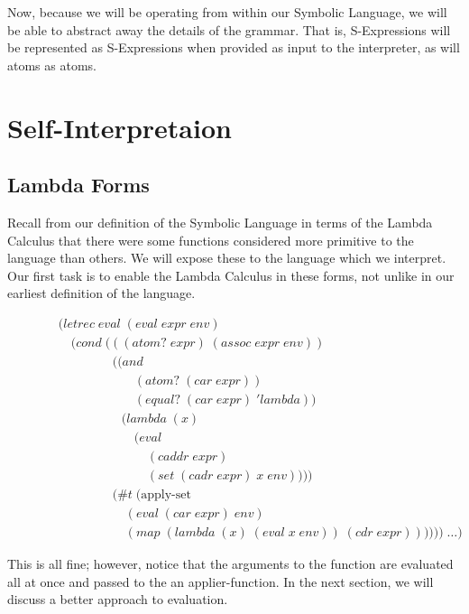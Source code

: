 Now, because we will be operating from within our Symbolic Language, we will 
be able to abstract away the details of the grammar. That is, S-Expressions 
will be represented as S-Expressions when provided as input to the 
interpreter, as will atoms as atoms.

\section{Self-Interpretaion}
\subsection{Lambda Forms}
Recall from our definition of the Symbolic Language in terms of the Lambda 
Calculus that there were some functions considered more primitive to the 
language than others. We will expose these to the language which we 
interpret. Our first task is to enable the Lambda Calculus in these forms, 
not unlike in our earliest definition of the language.

\begin{figure}[htp]
\footnotesize
\caption{}\label{fig:lambdaCalculusEval}
\begin{align*}
& (letrec \; eval \; (eval \; expr \; env)
\\& \quad (cond \; (((atom? \; expr) \; (assoc \; expr \; env))
\\& \qquad \qquad \; ((and \; 
\\& \qquad \qquad \qquad (atom? \; (car \; expr)) \; 
\\& \qquad \qquad \qquad (equal? \; (car \; expr) \; 'lambda)) \; 
\\& \qquad \qquad \quad (lambda \; (x) \; 
\\& \qquad \qquad \qquad (eval \; 
\\& \qquad \qquad \qquad \quad (caddr \; expr) \; 
\\& \qquad \qquad \qquad \quad (set \; (cadr \; expr) \; x \; env))))
\\& \qquad \qquad \; (\#t \; (\text{apply-set} \; 
\\& \qquad \qquad \quad \; (eval \; (car \; expr) \; env) \; 
\\& \qquad \qquad \quad \; (map \; (lambda \; (x) \; (eval \; x \; env)) \; (cdr \; expr)))))) \; \dots)
\end{align*}
\end{figure}

This is all fine; however, notice that the arguments to the function are 
evaluated all at once and passed to the an applier-function. In the next 
section, we will discuss a better approach to evaluation.

